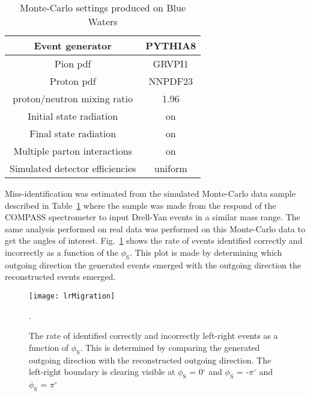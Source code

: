 \begin{table}[h!t]
  \centering
  \label{tab::MCproduction}
  \caption{Monte-Carlo settings produced on Blue Waters}
  \begin{tabular}{ |c|c| }
    \hline
    Event generator& PYTHIA8\\
    \hline

    Pion pdf& GRVPI1\\
    \hline

    Proton pdf& NNPDF23\\
    \hline
    
    proton/neutron mixing ratio& 1.96\\
    \hline

    Initial state radiation& on\\
    \hline
    
    Final state radiation& on\\
    \hline
    
    Multiple parton interactions& on\\
    \hline

    Simulated detector efficiencies& uniform\\
    \hline
    
  \end{tabular}
\end{table}

Miss-identification was estimated from the simulated Monte-Carlo data sample
described in Table~\ref{tab::MCproduction} where the sample was made from the
respond of the COMPASS spectrometer to input Drell-Yan events in a similar mass
range.  The same analysis performed on real data was performed on this
Monte-Carlo data to get the angles of interest.  Fig.~\ref{fig::lrMigration}
shows the rate of events identified correctly and incorrectly as a function of
the $\phi_{\mathrm{S}}$.  This plot is made by determining which outgoing
direction the generated events emerged with the outgoing direction the
reconstructed events emerged.

\begin{figure}[h!t]
  \centering
  \texttt{[image: lrMigration]}
  \caption{The rate of identified correctly and incorrectly left-right events as
    a function of $\phi_{\mathrm{S}}$.  This is determined by comparing the
    generated outgoing direction with the reconstructed outgoing direction.  The
    left-right boundary is clearing visible at $\phi_{\mathrm{S}}$ = 0$^{\circ}$
    and $\phi_{\mathrm{S}}$ = -$\pi^{\circ}$ and $\phi_{\mathrm{S}}$ =
    $\pi^{\circ}$}.
  \label{fig::lrMigration}
\end{figure}

